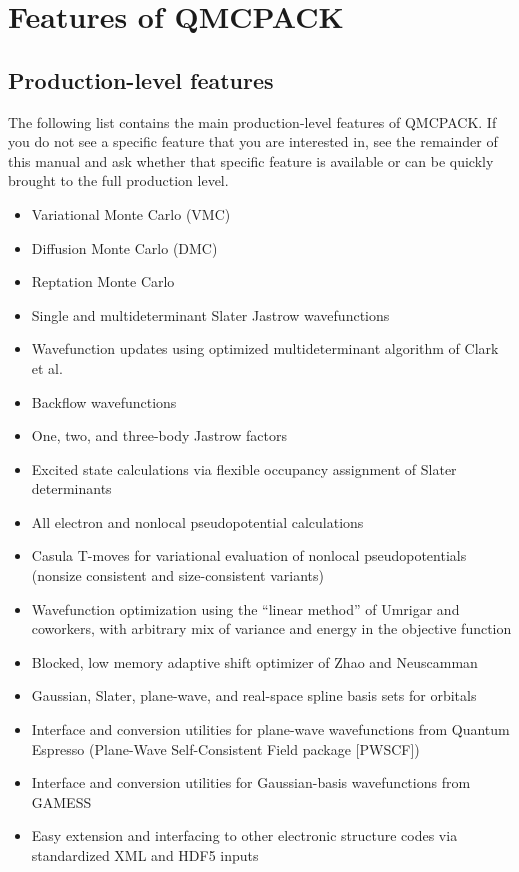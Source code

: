 \chapter{Features of QMCPACK}
\label{chap:features}
\section{Production-level features}
The following list contains the main production-level features of QMCPACK. If
you do not see a specific feature that you are interested in,
see the remainder of this manual and ask whether that specific feature is
available or can be quickly  brought to the full production level.

\begin{itemize}
\item Variational Monte Carlo (VMC)
\item Diffusion Monte Carlo (DMC)
\item Reptation Monte Carlo
\item Single and multideterminant Slater Jastrow wavefunctions
\item Wavefunction updates using optimized multideterminant algorithm of Clark et al.
\item Backflow wavefunctions
\item One, two, and three-body Jastrow factors
\item Excited state calculations via flexible occupancy assignment of Slater determinants
\item All electron and nonlocal pseudopotential calculations
\item Casula T-moves for variational evaluation of nonlocal
  pseudopotentials (nonsize consistent and size-consistent variants)
\item Wavefunction optimization using the ``linear method'' of Umrigar
  and coworkers, with arbitrary mix of variance and energy in the
  objective function
\item Blocked, low memory adaptive shift optimizer of Zhao and Neuscamman 
\item Gaussian, Slater, plane-wave, and real-space spline basis sets for orbitals
\item Interface and conversion utilities for plane-wave wavefunctions from Quantum Espresso (Plane-Wave Self-Consistent Field package [PWSCF])
\item Interface and conversion utilities for Gaussian-basis wavefunctions from GAMESS
\item Easy extension and interfacing to other electronic structure codes via standardized XML and HDF5 inputs

\end{itemize}
